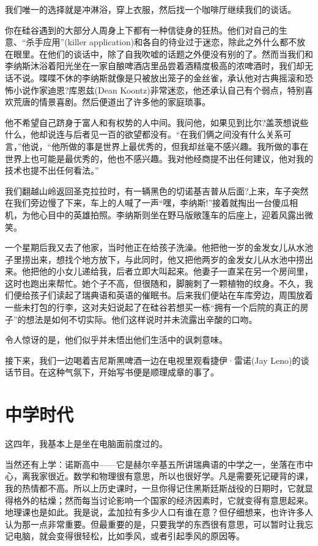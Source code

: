 我们唯一的选择就是冲淋浴，穿上衣服，然后找一个咖啡厅继续我们的谈话。

你在硅谷遇到的大部分人周身上下都有一种信徒身的狂热。他们对自己的生意、“杀手应用”(killer application)和各自的待业过于迷恋，除此之外什么都不放在眼里。在他们的谈话中，除了自我吹嘘的话题之外便没有别的了。然而当我们和李纳斯沐浴着阳光坐在一家自酿啤酒店里品尝着酒精度极高的浓啤酒时，我们却无话不说。喋喋不休的李纳斯就像是只被放出笼子的金丝雀，承认他对古典摇滚和恐怖小说作家迪恩?库恩兹(Dean Koontz)非常迷恋，他还承认自己有个弱点，特别喜欢荒唐的情景喜剧。然后便道出了许多他的家庭琐事。

他不希望自己跻身于富人和有权势的人中间。我问他，如果见到比尔?盖茨想说些什么，他却说连与后者见一百的欲望都没有。“在我们俩之间没有什么关系可言，”他说，“他所做的事是世界上最优秀的，但我却丝毫不感兴趣。我所做的事在世界上也可能是最优秀的，他也不感兴趣。我对他经商提不出任何建议，他对我的技术也提不出任何看法。”

我们翻越山岭返回圣克拉拉时，有一辆黑色的切诺基吉普从后面?上来，车子突然在我们旁边慢了下来，车上的人喊了一声“嘿，李纳斯!”接着就掏出一台傻瓜相机，为他心目中的英雄拍照。李纳斯则坐在野马版敞篷车的后座上，迎着风露出微笑。

一个星期后我又去了他家，当时他正在给孩子洗澡。他把他一岁的金发女儿从水池子里捞出来，想找个地方放下，与此同时，他又把他两岁的金发女儿从水池中捞出来。他把他的小女儿递给我，后者立即大叫起来。他妻子一直呆在另一个房间里，这时也跑出来帮忙。她个子不高，但很随和，脚腕刺了一颗植物的纹身。不久，我们便给孩子们读起了瑞典语和英语的催眠书。后来我们便站在车库旁边，周围放着一些未打包的行李，这对夫妇说起了在硅谷若想买一栋“拥有一个后院的真正的房子”的想法是如何不切实际。他们这样说时并未流露出辛酸的口吻。

令人惊讶的是，他们似乎并未悟出他们生活中的讽刺意味。

接下来，我们一边喝着吉尼斯黑啤酒一边在电视里观看捷伊·雷诺(Jay Leno)的谈话节目。在这种气氛下，开始写书便是顺理成章的事了。

 
\section{中学时代}

这四年，我基本上是坐在电脑面前度过的。

当然还有上学：诺斯高中——它是赫尔辛基五所讲瑞典语的中学之一，坐落在市中心，离我家很近。数学和物理很有意思，所以也很好学。凡是需要死记硬背的课，我的热情都不高。所以上历史课时，一旦你得记住黑斯廷斯战役的日期时，它就显得格外的枯燥；然而每当讨论影响一个国家的经济因素时，它就变得有意思起来。地理课也是如此。我是说，孟加拉有多少人口有谁在意？但仔细想来，也许许多人认为那一点非常重要。但最重要的是，只要我学的东西很有意思，可以暂时让我忘记电脑，就会变得很轻松，比如季风，或者引起季风的原因等。

